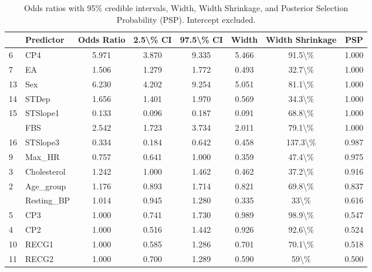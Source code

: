 \begin{table}

\caption{Odds ratios with 95\% credible intervals, Width, Width Shrinkage, and Posterior Selection Probability (PSP). Intercept excluded.}
\centering
\begin{tabular}[t]{llcccccc}
\toprule
  & Predictor & Odds Ratio & 2.5\textbackslash{}\% CI & 97.5\textbackslash{}\% CI & Width & Width Shrinkage & PSP\\
\midrule
6 & CP4 & 5.971 & 3.870 & 9.335 & 5.466 & 91.5\textbackslash{}\% & 1.000\\
7 & EA & 1.506 & 1.279 & 1.772 & 0.493 & 32.7\textbackslash{}\% & 1.000\\
13 & Sex & 6.230 & 4.202 & 9.254 & 5.051 & 81.1\textbackslash{}\% & 1.000\\
14 & STDep & 1.656 & 1.401 & 1.970 & 0.569 & 34.3\textbackslash{}\% & 1.000\\
15 & STSlope1 & 0.133 & 0.096 & 0.187 & 0.091 & 68.8\textbackslash{}\% & 1.000\\
\addlinespace
8 & FBS & 2.542 & 1.723 & 3.734 & 2.011 & 79.1\textbackslash{}\% & 1.000\\
16 & STSlope3 & 0.334 & 0.184 & 0.642 & 0.458 & 137.3\textbackslash{}\% & 0.987\\
9 & Max\_HR & 0.757 & 0.641 & 1.000 & 0.359 & 47.4\textbackslash{}\% & 0.975\\
3 & Cholesterol & 1.242 & 1.000 & 1.462 & 0.462 & 37.2\textbackslash{}\% & 0.916\\
2 & Age\_group & 1.176 & 0.893 & 1.714 & 0.821 & 69.8\textbackslash{}\% & 0.837\\
\addlinespace
12 & Resting\_BP & 1.014 & 0.945 & 1.280 & 0.335 & 33\textbackslash{}\% & 0.616\\
5 & CP3 & 1.000 & 0.741 & 1.730 & 0.989 & 98.9\textbackslash{}\% & 0.547\\
4 & CP2 & 1.000 & 0.516 & 1.442 & 0.926 & 92.6\textbackslash{}\% & 0.524\\
10 & RECG1 & 1.000 & 0.585 & 1.286 & 0.701 & 70.1\textbackslash{}\% & 0.518\\
11 & RECG2 & 1.000 & 0.700 & 1.289 & 0.590 & 59\textbackslash{}\% & 0.500\\
\bottomrule
\end{tabular}
\end{table}
